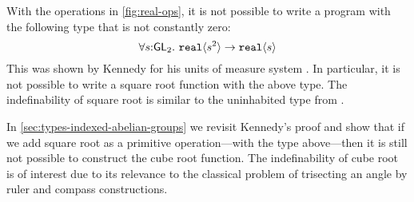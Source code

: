 \begin{example}
  With the operations in \autoref{fig:real-ops}, it is not possible to
  write a program with the following type that is not constantly zero:
  \begin{displaymath}
    \forall s \mathord: \SynGL{2}.\ \tyPrim{real}{s^2} \to \tyPrim{real}{s}
  \end{displaymath}
  This was shown by Kennedy for his units of measure system
  \cite{kennedy97relational}.  In particular, it is not possible to
  write a square root function with the above type. The indefinability
  of square root is similar to the uninhabited type from
  .

  In \autoref{sec:types-indexed-abelian-groups} we revisit Kennedy's
  proof and show that if we add square root as a primitive
  operation---with the type above---then it is still not possible to
  construct the cube root function. The indefinability of cube root is
  of interest due to its relevance to the classical problem of
  trisecting an angle by ruler and compass constructions.
\end{example}


